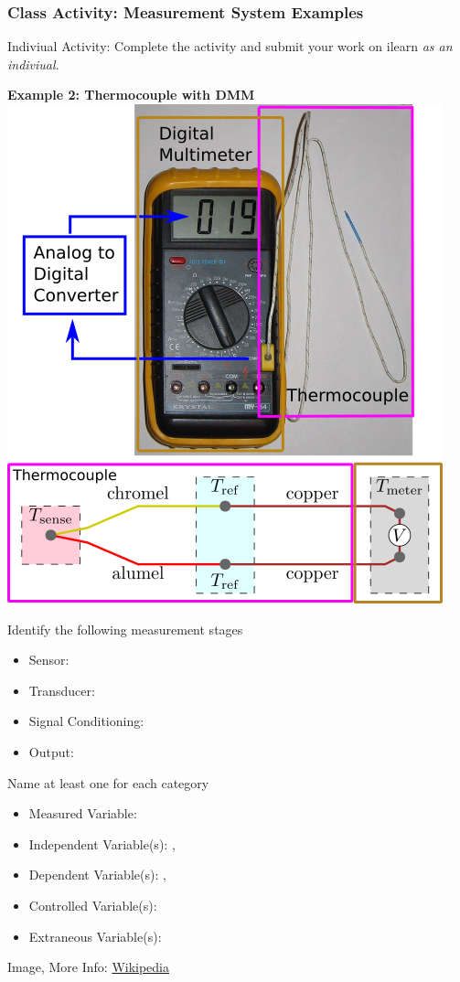 \documentclass[fleqn]{beamer} %
\newcommand{\sectiontitleV}{Class Activity: Measurement System Examples}
\begin{document}
	\begin{frame}[label=sectionV]
		\frametitle{\sectiontitleV}
			\tiny
		
		Indiviual Activity: Complete the activity and submit your work on ilearn {\it as an indiviual}.	

	        \begin{multicols}{2}
		
		    \textbf{Example 2: Thermocouple with DMM} \vspc
		    \includegraphics[scale=0.35]{thermocouple_atd.png} \vspc

		    Identify the following measurement stages 
		    \begin{itemize}
		    	\item Sensor: \hspcu
		    	\item Transducer: \hspcu
		    	\item Signal Conditioning: \hspcu
		    	\item Output: \hspcu
		    \end{itemize}


		    Name at least one for each category 
	
			\begin{itemize}
				\item Measured Variable: \hspcu \vspc 
				\item Independent Variable(s): \hspcu, \hspcu \vspc
				\item Dependent Variable(s): \hspcu, \hspcu \vspc 
				\item Controlled Variable(s): \hspcu \vspc 
				\item Extraneous Variable(s):\hspcu \vspc
			\end{itemize}
			
			\end{multicols}	

			{\tiny Image, More Info: \href{https://en.wikipedia.org/wiki/Thermocouple}{Wikipedia} }\hspace{40mm} 

	\end{frame}
\end{document}
